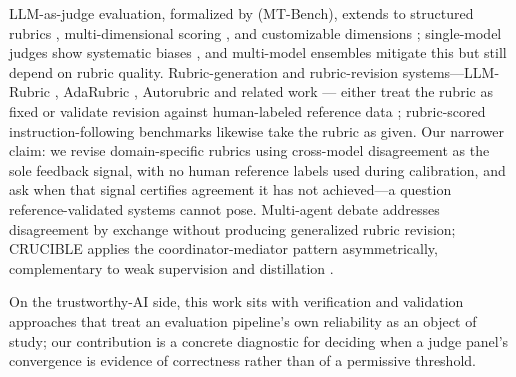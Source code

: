 \documentclass[letterpaper]{article}
\begin{document}
LLM-as-judge evaluation, formalized by \citet{zheng2023judging} (MT-Bench),
extends to structured rubrics \citep{liu2023geval}, multi-dimensional
scoring \citep{kim2024prometheus}, and customizable dimensions
\citep{fu2023gptscore}; single-model judges show systematic biases
\citep{zheng2023judging,thakur2024judging}, and multi-model ensembles
\citep{chan2023chateval} mitigate this but still depend on rubric quality.
Rubric-generation and rubric-revision systems---LLM-Rubric
\citep{hashemi2024llmrubric}, AdaRubric \citep{ding2026adarubric}, Autorubric
\citep{rao2026autorubric} and related work \citep{shen2026rrd,siro2026ger}---
either treat the rubric as fixed or validate revision against human-labeled
reference data \citep{shi2025patch}; rubric-scored instruction-following
benchmarks \citep{su2026sciif} likewise take the rubric as given. Our narrower
claim: we revise domain-specific rubrics using cross-model disagreement as the
sole feedback signal, with no human reference labels used during calibration,
and ask when that signal certifies agreement it has not achieved---a question
reference-validated systems cannot pose. Multi-agent debate
\citep{du2023improving} addresses disagreement by exchange without producing
generalized rubric revision; CRUCIBLE applies the coordinator-mediator pattern
asymmetrically, complementary to weak supervision
\citep{ratner2017snorkel,zhang2022pws} and distillation
\citep{hinton2015distilling}.

On the trustworthy-AI side, this work sits with verification and validation
approaches that treat an evaluation pipeline's own reliability as an object of
study; our contribution is a concrete diagnostic for deciding when a judge
panel's convergence is evidence of correctness rather than of a permissive
threshold.
\end{document}
